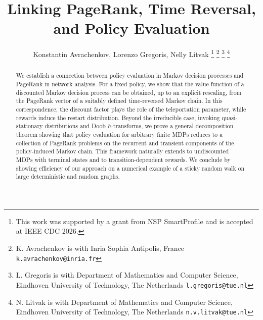 \documentclass[letterpaper, 10 pt, conference]{ieeeconf}
\begin{document}
\title{\bf \Large
Linking PageRank, Time Reversal, and Policy Evaluation
}



\author{Konstantin Avrachenkov, Lorenzo Gregoris, Nelly Litvak%
\thanks{This work was supported by a grant from NSP SmartProfile and is accepted at IEEE CDC 2026.}%
\thanks{K. Avrachenkov is with Inria Sophia Antipolis, France
        {\tt\small k.avrachenkov@inria.fr}}%
\thanks{L. Gregoris is with Department of Mathematics and Computer Science, Eindhoven University of Technology, The Netherlands
        {\tt\small l.gregoris@tue.nl}}%
\thanks{N. Litvak is with Department of Mathematics and Computer Science, Eindhoven University of Technology, The Netherlands
        {\tt\small n.v.litvak@tue.nl}}%
}

\maketitle

\begin{abstract}
We establish a connection between policy evaluation in Markov decision processes and PageRank in network analysis.
For a fixed policy, we show that the value function of a discounted Markov
decision process can be obtained, up to an explicit rescaling, from the PageRank
vector of a suitably defined time-reversed Markov chain.
In this correspondence, the discount factor plays the role of the teleportation
parameter, while rewards induce the restart distribution.
Beyond the irreducible case, invoking quasi-stationary distributions and Doob $h$-transforms, 
we prove a general decomposition theorem showing
that policy evaluation for arbitrary finite MDPs reduces to a collection of PageRank problems on the recurrent and transient components of the
policy-induced Markov chain.
This framework naturally extends to undiscounted MDPs with terminal states and to transition-dependent rewards.
We conclude by showing efficiency of our approach on a numerical example of a sticky random walk on large deterministic and random graphs.
\end{abstract}

\end{document}
